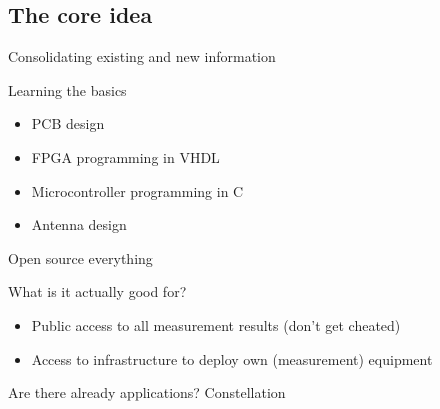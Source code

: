 \subsection{The core idea}
	\begin{frame}{Consolidating existing and new information}
	\end{frame}
	\begin{frame}{Learning the basics}
		\begin{itemize}
			\item PCB design
			\item FPGA programming in VHDL
			\item Microcontroller programming in C
			\item Antenna design
		\end{itemize}
	\end{frame}
	\begin{frame}{Open source everything}
	\end{frame}
	\begin{frame}{What is it actually good for?}
		\begin{itemize}
			\item Public access to all measurement results (don't get cheated)
			\item Access to infrastructure to deploy own (measurement) equipment
		\end{itemize}
	\end{frame}
	\begin{frame}{Are there already applications?}
		Constellation
	\end{frame}

